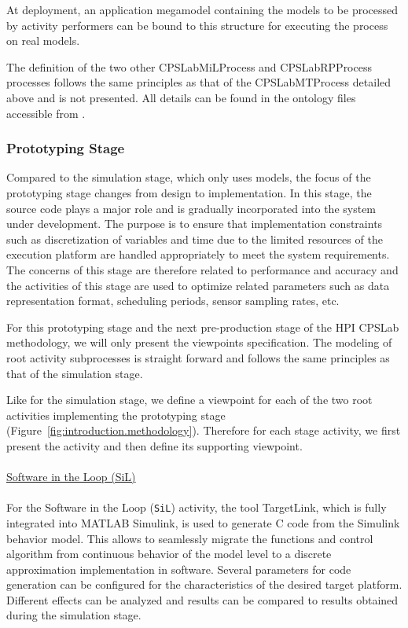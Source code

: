At deployment, an application megamodel containing the models to be processed by activity performers can be bound to this structure for executing the process on real models.

The definition of the two other CPSLabMiLProcess and CPSLabRPProcess processes follows the same principles as that of the CPSLabMTProcess detailed above and is not presented. All details can be found in the ontology files accessible from \cite{MPM4CPS-Website}. 
\\
\subsubsection{Prototyping Stage}
%
Compared to the simulation stage, which only uses models, the focus of the prototyping stage changes from design to implementation. In this stage, the source code plays a major role and is gradually incorporated into the system under development. The purpose is to ensure that implementation constraints such as discretization of variables and time due to the limited resources of the execution platform are handled appropriately to meet the system requirements. The concerns of this stage are therefore related to performance and accuracy and the activities of this stage are used to optimize related parameters such as data representation format, scheduling periods, sensor sampling rates, etc.

For this prototyping stage and the next pre-production stage of the HPI CPSLab methodology, we will only present the viewpoints specification. The modeling of root activity subprocesses is straight forward and follows the same principles as that of the simulation stage. 

Like for the simulation stage, we define a viewpoint for each of the two root activities implementing the prototyping stage (Figure~\ref{fig:introduction.methodology}). Therefore for each stage activity, we first present the activity and then define its supporting viewpoint.
\\
\\
\uline{Software in the Loop (SiL)}
\\
\\
For the Software in the Loop (\texttt{SiL}) activity, the tool TargetLink, which is fully integrated into MATLAB Simulink, is used to generate C code from the Simulink behavior model. This allows to seamlessly migrate the functions and control algorithm from continuous behavior of the model level to a discrete approximation implementation in software. Several parameters for code generation can be configured for the characteristics of the desired target platform. Different effects can be analyzed and results can be compared to results obtained during the simulation stage.

